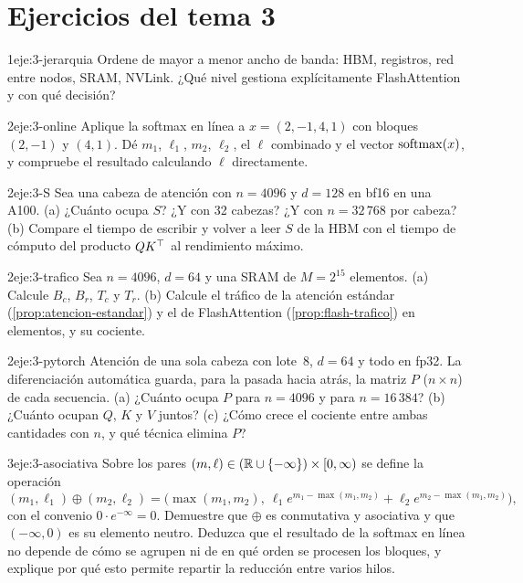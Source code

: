 \section*{Ejercicios del tema 3}

\begin{ejercicio}{1}{eje:3-jerarquia}
Ordene de mayor a menor ancho de banda: HBM, registros, red entre nodos, SRAM, NVLink. ¿Qué nivel gestiona explícitamente FlashAttention y con qué decisión?
\end{ejercicio}

\begin{ejercicio}{2}{eje:3-online}
Aplique la softmax en línea a $x=(2,-1,4,1)$ con bloques $(2,-1)$ y $(4,1)$. Dé $m_1$, $\ell_1$, $m_2$, $\ell_2$, el $\ell$ combinado y el vector $\operatorname{softmax}(x)$, y compruebe el resultado calculando $\ell$ directamente.
\end{ejercicio}

\begin{ejercicio}{2}{eje:3-S}
Sea una cabeza de atención con $n=4096$ y $d=128$ en bf16 en una A100. (a) ¿Cuánto ocupa $S$? ¿Y con 32 cabezas? ¿Y con $n=32\,768$ por cabeza? (b) Compare el tiempo de escribir y volver a leer $S$ de la HBM con el tiempo de cómputo del producto $QK^{\top}$ al rendimiento máximo.
\end{ejercicio}

\begin{ejercicio}{2}{eje:3-trafico}
Sea $n=4096$, $d=64$ y una SRAM de $M=2^{15}$ elementos. (a) Calcule $B_c$, $B_r$, $T_c$ y $T_r$. (b) Calcule el tráfico de la atención estándar (\cref{prop:atencion-estandar}) y el de FlashAttention (\cref{prop:flash-trafico}) en elementos, y su cociente.
\end{ejercicio}

\begin{ejercicio}{2}{eje:3-pytorch}
Atención de una sola cabeza con lote~8, $d=64$ y todo en fp32. La diferenciación automática guarda, para la pasada hacia atrás, la matriz $P$ ($n\times n$) de cada secuencia. (a) ¿Cuánto ocupa $P$ para $n=4096$ y para $n=16\,384$? (b) ¿Cuánto ocupan $Q$, $K$ y $V$ juntos? (c) ¿Cómo crece el cociente entre ambas cantidades con $n$, y qué técnica elimina $P$?
\end{ejercicio}

\begin{ejercicio}{3}{eje:3-asociativa}
Sobre los pares $(m,\ell)\in(\mathbb{R}\cup\{-\infty\})\times[0,\infty)$ se define la operación
\[
(m_1,\ell_1)\oplus(m_2,\ell_2)=\bigl(\max(m_1,m_2),\ \ell_1e^{m_1-\max(m_1,m_2)}+\ell_2e^{m_2-\max(m_1,m_2)}\bigr),
\]
con el convenio $0\cdot e^{-\infty}=0$. Demuestre que $\oplus$ es conmutativa y asociativa y que $(-\infty,0)$ es su elemento neutro. Deduzca que el resultado de la softmax en línea no depende de cómo se agrupen ni de en qué orden se procesen los bloques, y explique por qué esto permite repartir la reducción entre varios hilos.
\end{ejercicio}
